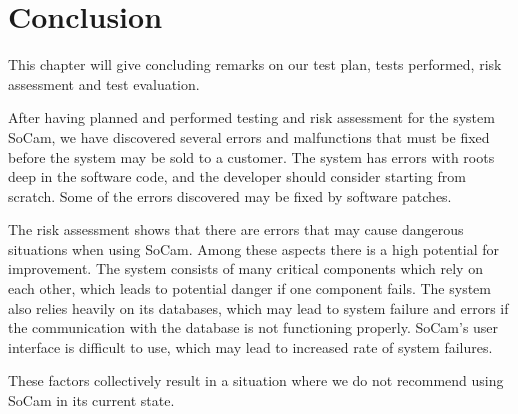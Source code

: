 	\section{Conclusion}

		This chapter will give concluding remarks on our test plan, tests performed, risk assessment and test evaluation. 

		After having planned and performed testing and risk assessment for the system SoCam, we have discovered several errors and malfunctions that must be fixed before the system may be sold to a customer. The system has errors with roots deep in the software code, and the developer should consider starting from scratch. Some of the errors discovered may be fixed by software patches. 

		The risk assessment shows that there are errors that may cause dangerous situations when using SoCam. Among these aspects there is a high potential for improvement. The system consists of many critical components which rely on each other, which leads to potential danger if one component fails. The system also relies heavily on its databases, which may lead to system failure and errors if the communication with the database is not functioning properly. SoCam’s user interface is difficult to use, which may lead to increased rate of system failures. 

		These factors collectively result in a situation where we do not recommend using SoCam in its current state.



